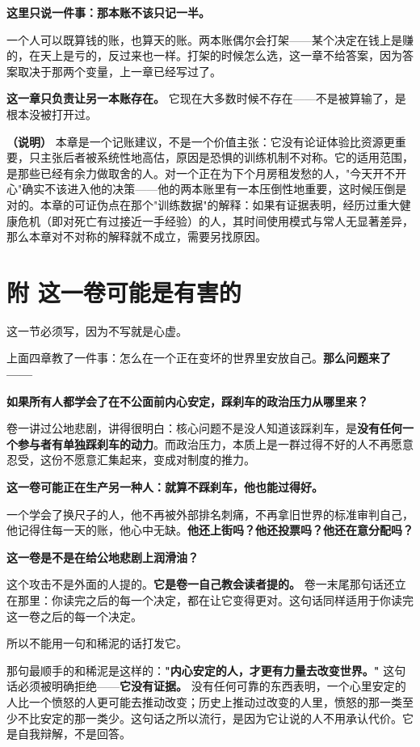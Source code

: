 \documentclass[11pt,a4paper]{ctexart}
\begin{document}
\textbf{这里只说一件事：那本账不该只记一半。}

一个人可以既算钱的账，也算天的账。两本账偶尔会打架——某个决定在钱上是赚的，在天上是亏的，反过来也一样。打架的时候怎么选，这一章不给答案，因为答案取决于那两个变量，上一章已经写过了。

\textbf{这一章只负责让另一本账存在。} 它现在大多数时候不存在——不是被算输了，是根本没被打开过。

\textbf{（说明）} 本章是一个记账建议，不是一个价值主张：它没有论证体验比资源更重要，只主张后者被系统性地高估，原因是恐惧的训练机制不对称。它的适用范围，是那些已经有余力做取舍的人。对一个正在为下个月房租发愁的人，"今天开不开心"确实不该进入他的决策——他的两本账里有一本压倒性地重要，这时候压倒是对的。本章的可证伪点在那个"训练数据"的解释：如果有证据表明，经历过重大健康危机（即对死亡有过接近一手经验）的人，其时间使用模式与常人无显著差异，那么本章对不对称的解释就不成立，需要另找原因。

\section{附 \textperiodcentered{} 这一卷可能是有害的}

这一节必须写，因为不写就是心虚。

上面四章教了一件事：怎么在一个正在变坏的世界里安放自己。\textbf{那么问题来了——}

\textbf{如果所有人都学会了在不公面前内心安定，踩刹车的政治压力从哪里来？}

卷一讲过公地悲剧，讲得很明白：核心问题不是没人知道该踩刹车，是\textbf{没有任何一个参与者有单独踩刹车的动力}。而政治压力，本质上是一群过得不好的人不再愿意忍受，这份不愿意汇集起来，变成对制度的推力。

\textbf{这一卷可能正在生产另一种人：就算不踩刹车，他也能过得好。}

一个学会了换尺子的人，他不再被外部排名刺痛，不再拿旧世界的标准审判自己，他记得住每一天的账，他心中无缺。\textbf{他还上街吗？他还投票吗？他还在意分配吗？}

\textbf{这一卷是不是在给公地悲剧上润滑油？}

这个攻击不是外面的人提的。\textbf{它是卷一自己教会读者提的。} 卷一末尾那句话还立在那里：你读完之后的每一个决定，都在让它变得更对。这句话同样适用于你读完这一卷之后的每一个决定。

所以不能用一句和稀泥的话打发它。

那句最顺手的和稀泥是这样的：\textbf{"内心安定的人，才更有力量去改变世界。"} 这句话必须被明确拒绝——\textbf{它没有证据。} 没有任何可靠的东西表明，一个心里安定的人比一个愤怒的人更可能去推动改变；历史上推动过改变的人里，愤怒的那一类至少不比安定的那一类少。这句话之所以流行，是因为它让说的人不用承认代价。它是自我辩解，不是回答。
\end{document}
